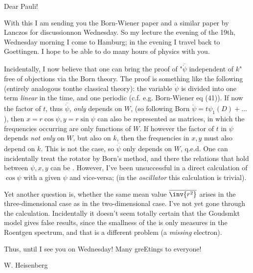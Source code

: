 \date{January 14, 1926}

Dear Pauli!

With this I am sending you the Born-Wiener paper and a similar paper by Lanczos for discussionnon Wednesday. So my lecture the evening of the 19th, Wednesday morning I come to Hamburg; in the evening I travel back to Goettingen. I hope to be able to do many hours of physics with you. 

Incidentally, I now believe that one can bring the proof of "$\overline{\dot{\psi}}$ independent of $k$" free of objections via the Born theory. The proof is something like the following (entirely analogous tonthe classical theory): the variable $\dot{\psi}$ is divided into one term \textit{linear} in the time, and one periodic (c.f. e.g. Born-Wiener eq (41)). If now the factor of $t$, thus $\overline{\dot{\psi}}$, \textit{only} depends on $W$, (so following Born $\dot{\psi} = t\psi_1(D)+\dots$), then $x=r\cos\psi, y=r\sin\psi$ can also be represented as matrices, in which the frequencies occurring are only functions of $W$. If however the factor of $t$ in $\psi$ depends \textit{not only} on $W$, but also on $k$, then the frequencies in $x,y$ must also depend on $k$. This is not the case, so $\overline{\dot{\psi}}$ only depends on $W$, q.e.d. One can incidentally treat the rotator by Born's method, and there the relations that hold between $\psi,x,y$ can be . However, I've been unsuccessful in a direct calculation of $\cos\psi$ with a given $\psi$ and vice-versa; (in the \textit{oscillator} this calculation is trivial).

Yet another question is, whether the same mean value $\overline{\inv{r^2}}$ arises in the three-dimensional case as in the two-dimensional case. I've not yet gone through the calculation. Incidentally it doesn't seem totally certain that the Goudsmkt model gives false results, since the smallness of the  is only measures in the Roentgen spectrum, and that is a different problem (a \textit{missing} electron).

Thus, until I see you on Wednesday! Many greEtings to everyone!

W. Heisenberg
